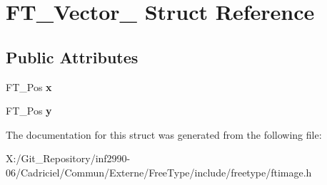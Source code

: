 \hypertarget{struct_f_t___vector__}{\section{F\-T\-\_\-\-Vector\-\_\- Struct Reference}
\label{struct_f_t___vector__}
}
\subsection*{Public Attributes}
\begin{DoxyCompactItemize}
\item 
\hypertarget{struct_f_t___vector___a941e818e6dfca06409cddff4f325f74c}{F\-T\-\_\-\-Pos {\bfseries x}}\label{struct_f_t___vector___a941e818e6dfca06409cddff4f325f74c}

\item 
\hypertarget{struct_f_t___vector___ac3246ed214e880047ec74eeb15f8b973}{F\-T\-\_\-\-Pos {\bfseries y}}\label{struct_f_t___vector___ac3246ed214e880047ec74eeb15f8b973}

\end{DoxyCompactItemize}


The documentation for this struct was generated from the following file\-:\begin{DoxyCompactItemize}
\item 
X\-:/\-Git\-\_\-\-Repository/inf2990-\/06/\-Cadriciel/\-Commun/\-Externe/\-Free\-Type/include/freetype/ftimage.\-h\end{DoxyCompactItemize}

